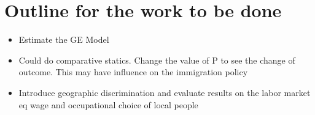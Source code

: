 \documentclass[12pt]{article}
\begin{document}
\pagebreak

\section{Outline for the work to be done}
\begin{itemize}
\item Estimate the GE Model 
\item Could do comparative statics. Change the value of P to see the change of outcome. This may have influence on the immigration policy
\item Introduce geographic discrimination and evaluate results on the labor market eq wage and occupational choice of local people
\end{itemize}

\pagebreak
\end{document}
